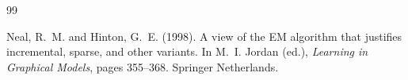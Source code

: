 \documentclass{scrartcl}
\begin{document}
\begin{thebibliography}{99}

Neal, R.~M. and Hinton, G.~E. (1998).
\newblock A view of the EM algorithm that justifies incremental, sparse, and other variants.
\newblock In M.~I. Jordan (ed.), \emph{Learning in Graphical Models},
pages 355--368. Springer Netherlands.  








  




\end{thebibliography}
\end{document}
